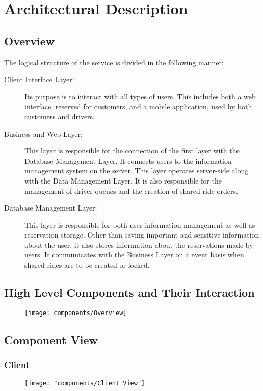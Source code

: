 \section{Architectural Description}

\subsection{Overview}
	The logical structure of the service is divided in the following manner:
	\begin{description}
		\item[Client Interface Layer:] Its purpose is to interact with all types of users. This includes both a web interface, reserved for customers, and a mobile application,
			used by both customers and drivers.
		\item[Business and Web Layer:] This layer is responsible for the connection of the first layer with the Database Management Layer. It connects users to the information management
			system on the server. This layer operates server-side along with the Data Management Layer. It is also responsible for the management of driver queues and
			the creation of shared ride orders.
		\item[Database Management Layer:] This layer is responsible for both user information management as well as reservation storage. Other than saving important and sensitive
			information about the user, it also stores information about the reservations made by users. It communicates with the Business Layer on a event basis when shared rides
			are to be created or locked.
	\end{description}
\newpage
\subsection{High Level Components and Their Interaction}

	\begin{figure}[h!]
		\centering
		\texttt{[image: components/Overview]}
	\end{figure}

\subsection{Component View}
	\subsubsection{Client}
		\begin{figure}[h!]
			\centering
			\texttt{[image: "components/Client View"]}
		\end{figure}
